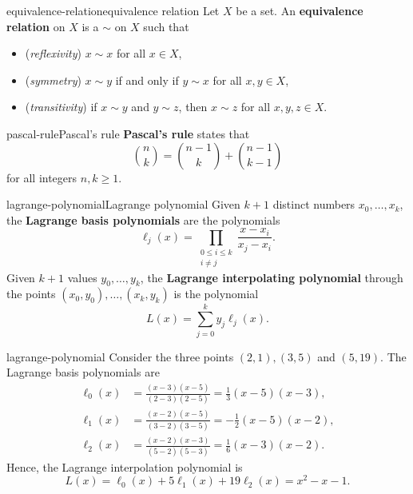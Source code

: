 \begin{topic}{equivalence-relation}{equivalence relation}
    Let $X$ be a set. An \textbf{equivalence relation} on $X$ is a  $\sim$ on $X$ such that
    \begin{itemize}
        \item (\textit{reflexivity}) $x \sim x$ for all $x \in X$,
        \item (\textit{symmetry}) $x \sim y$ if and only if $y \sim x$ for all $x, y \in X$,
        \item (\textit{transitivity}) if $x \sim y$ and $y \sim z$, then $x \sim z$ for all $x, y, z \in X$.
    \end{itemize}
\end{topic}

\begin{topic}{pascal-rule}{Pascal's rule}
    \textbf{Pascal's rule} states that
    \[ \binom{n}{k} = \binom{n - 1}{k} + \binom{n - 1}{k - 1} \]
    for all integers $n, k \ge 1$.
\end{topic}

\begin{topic}{lagrange-polynomial}{Lagrange polynomial}
    Given $k + 1$ distinct numbers $x_0, \ldots, x_k$, the \textbf{Lagrange basis polynomials} are the polynomials
    \[ \ell_j(x) = \prod_{\substack{0 \le i \le k \\ i \ne j}} \frac{x - x_i}{x_j - x_i} . \]
    Given $k + 1$ values $y_0, \ldots, y_k$, the \textbf{Lagrange interpolating polynomial} through the points $(x_0, y_0), \ldots, (x_k, y_k)$ is the polynomial
    \[ L(x) = \sum_{j = 0}^{k} y_j \ell_j(x) . \]
\end{topic}

\begin{example}{lagrange-polynomial}
    Consider the three points $(2, 1), (3, 5)$ and $(5, 19)$. The Lagrange basis polynomials are
    \[ \begin{aligned}
        \ell_0(x) &= \frac{(x - 3)(x - 5)}{(2 - 3)(2 - 5)} = \tfrac{1}{3} (x - 5)(x - 3) , \\
        \ell_1(x) &= \frac{(x - 2)(x - 5)}{(3 - 2)(3 - 5)} = -\tfrac{1}{2} (x - 5)(x - 2) , \\
        \ell_2(x) &= \frac{(x - 2)(x - 3)}{(5 - 2)(5 - 3)} = \tfrac{1}{6} (x - 3)(x - 2) .
    \end{aligned} \]
    Hence, the Lagrange interpolation polynomial is
    \[ L(x) = \ell_0(x) + 5 \ell_1(x) + 19 \ell_2(x) = x^2 - x - 1 . \]
\end{example}

